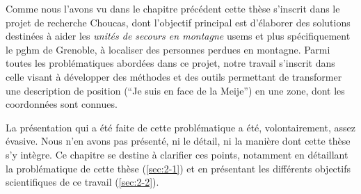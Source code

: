 Comme nous l'avons vu dans le chapitre précédent cette thèse s'inscrit
dans le projet de recherche Choucas, dont l'objectif principal est
d’élaborer des solutions destinées à aider les \emph{unités de secours
  en montagne} \acp{usem} et plus spécifiquement le \ac{pghm} de
Grenoble, à localiser des personnes perdues en montagne. Parmi toutes
les problématiques abordées dans ce projet, notre travail s'inscrit
dans celle visant à développer des méthodes et des outils permettant
de transformer une description de position (\eg \enquote{Je suis en
  face de la Meije}) en une zone, dont les coordonnées sont connues.

La présentation qui a été faite de cette problématique a été,
volontairement, assez évasive. Nous n'en avons pas présenté, ni le
détail, ni la manière dont cette thèse s'y intègre. Ce chapitre se
destine à clarifier ces points, notamment en détaillant la
problématique de cette thèse (\autoref{sec:2-1}) et en présentant les
différents objectifs scientifiques de ce travail (\autoref{sec:2-2}).

